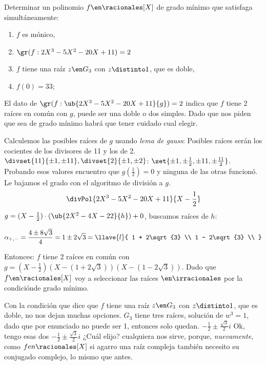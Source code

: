 \begin{enunciado}{\ejExtra}
        Determinar un polinomio $f \en \racionales[X]$ de grado mínimo que satisfaga 
        simultáneamente:\par

\begin{enumerate}[label=$\scriptscriptstyle\blacksquare$]
	\item $f$ es mónico,
    \item $\gr(f:2X^3-5X^2-20X +11) = 2$
    \item $f$ tiene una raíz $z \en G_3$ con $z \distinto 1$, que es doble,
	\item $f(0) = 33$;
\end{enumerate}
\end{enunciado}

El dato de
    $\gr(f:\ub{2X^3-5X^2-20X +11}{g}) = 2$ indica que $f$ tiene 2 raíces en común con $g$, 
    puede ser una doble o dos simples. Dado que nos piden que sea de grado mínimo
    habrá que tener cuidado cual elegir.\par
    Calculemos las posibles raíces de $g$ usando \textit{lema de gauss}:
    Posibles raíces serán los cocientes de los divisores de 11 y los de 2.
    $\divset{11}{\pm1,\pm11}, \divset{2}{\pm1,\pm2}$:
    $\set{\pm 1,\pm\frac{1}{2},\pm 11, \pm\frac{11}{2}}$.
    Probando esos valores encuentro que $g(\frac{1}{2}) = 0$ y ninguna de las
    otras funcionó. Le bajamos el grado con el algoritmo de división a $g$.
$$
    \divPol{2X^3 - 5X^2 - 20X + 11}{X - \frac{1}{2}}
$$
    $g = (X-\frac{1}{2})\cdot(\ub{2X^2 - 4X -22}{h}) + 0 $, buscamos raíces de $h$:\par

    $$\alpha_{+,-} =
    \frac{4 \pm 8\sqrt{3}}{4} =
    1 \pm 2\sqrt{3} =
    \llave{l}{
            1 + 2\sqrt{3} \\
            1 - 2\sqrt{3} \\
    }
    $$

    Entonces: 
    $f$ tiene 2 raíces en común con 
    $g = (X - \frac{1}{2})(X - (1+2\sqrt{3})) (X - (1-2\sqrt{3})) $. Dado que 
    $f \en \racionales[X]$  voy a seleccionar las raíces $ \en \irracionales$ por
    la condiciónde grado mínimo.\bigskip

    Con la condición que dice que $f$ tiene una raíz $z \en G_3$ con $z \distinto 1$,
    que es doble, no nos dejan muchas opciones. $G_3$ tiene tres raíces, solución
    de $w^3 = 1$, dado que por enunciado no puede ser 1, entonces solo quedan.
    $-\frac{1}{2} \pm \frac{\sqrt{3}}{2}i$ 
    Ok, tengo esas dos $-\frac{1}{2} \pm \frac{\sqrt{3}}{2}i$ ¿Cuál elijo? cualquiera nos
    sirve, porque, \textit{nuevamente}, como $f en \racionales[X]$ si agarro una raíz compleja
    también necesito su conjugado complejo, lo mismo que antes.\par

